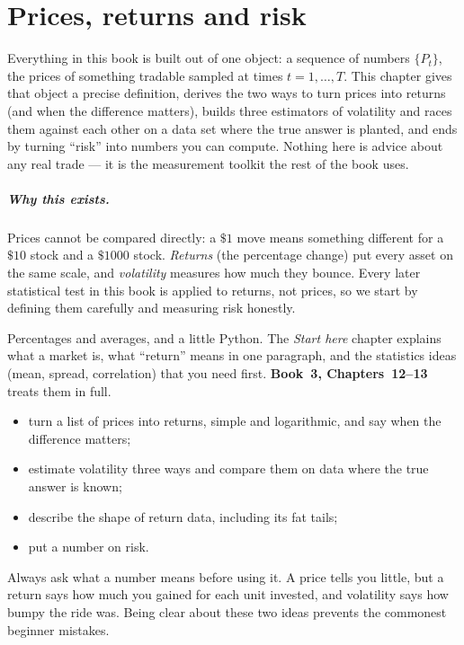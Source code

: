 \chapter{Prices, returns and risk}\label{ch:returns}

Everything in this book is built out of one object: a sequence of
numbers $\{P_t\}$, the prices of something tradable sampled at times
$t=1,\dots,T$. This chapter gives that object a precise definition,
derives the two ways to turn prices into returns (and when the
difference matters), builds three estimators of volatility and races
them against each other on a data set where the true answer is
planted, and ends by turning ``risk'' into numbers you can compute.
Nothing here is advice about any real trade --- it is the measurement
toolkit the rest of the book uses.

\paragraph{Why this exists.} Prices cannot be compared directly: a $\$1$ move means
something different for a $\$10$ stock and a $\$1000$ stock. \emph{Returns} (the percentage change) put
every asset on the same scale, and \emph{volatility} measures how much they bounce. Every later statistical test
in this book is applied to returns, not prices, so we start by defining them carefully and measuring risk
honestly.

\begin{rulebox}
Percentages and averages, and a little Python. The \emph{Start here} chapter explains what a market is, what ``return'' means in one paragraph, and the statistics ideas (mean, spread, correlation) that you need first. \textbf{Book~3, Chapters~12--13} treats them in full.
\end{rulebox}
\begin{wins}
\begin{itemize}
\item turn a list of prices into returns, simple and logarithmic, and say when the difference matters;
\item estimate volatility three ways and compare them on data where the true answer is known;
\item describe the shape of return data, including its fat tails;
\item put a number on risk.
\end{itemize}
\end{wins}
\begin{principle}
Always ask what a number means before using it. A price tells you little, but a return says how much you gained for each unit invested, and volatility says how bumpy the ride was. Being clear about these two ideas prevents the commonest beginner mistakes.
\end{principle}

